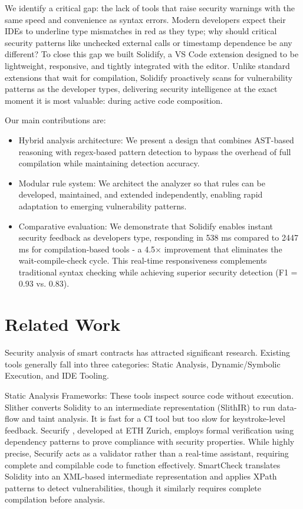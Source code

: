 \documentclass[10pt, a4paper]{article}
\begin{document}
We identify a critical gap: the lack of tools that raise security warnings with the same speed and convenience as syntax errors. Modern developers expect their IDEs to underline type mismatches in red as they type; why should critical security patterns like unchecked external calls or timestamp dependence be any different? To close this gap we built Solidify, a VS Code extension designed to be lightweight, responsive, and tightly integrated with the editor. Unlike standard extensions that wait for compilation, Solidify proactively scans for vulnerability patterns as the developer types, delivering security intelligence at the exact moment it is most valuable: during active code composition.

Our main contributions are:
\begin{itemize}
    \item Hybrid analysis architecture: We present a design that combines AST-based reasoning with regex-based pattern detection to bypass the overhead of full compilation while maintaining detection accuracy.
    \item Modular rule system: We architect the analyzer so that rules can be developed, maintained, and extended independently, enabling rapid adaptation to emerging vulnerability patterns.
    \item Comparative evaluation: We demonstrate that Solidify enables instant security feedback as developers type, responding in 538 ms compared to 2447 ms for compilation-based tools - a 4.5$\times$ improvement that eliminates the wait-compile-check cycle. This real-time responsiveness complements traditional syntax checking while achieving superior security detection (F1 = 0.93 vs. 0.83).
\end{itemize}

\section{Related Work}
Security analysis of smart contracts has attracted significant research. Existing tools generally fall into three categories: Static Analysis, Dynamic/Symbolic Execution, and IDE Tooling.

Static Analysis Frameworks: These tools inspect source code without execution. Slither \cite{feist2019} converts Solidity to an intermediate representation (SlithIR) to run data-flow and taint analysis. It is fast for a CI tool but too slow for keystroke-level feedback. Securify \cite{tsankov2018}, developed at ETH Zurich, employs formal verification using dependency patterns to prove compliance with security properties. While highly precise, Securify acts as a validator rather than a real-time assistant, requiring complete and compilable code to function effectively. SmartCheck \cite{tikhomirov2018} translates Solidity into an XML-based intermediate representation and applies XPath patterns to detect vulnerabilities, though it similarly requires complete compilation before analysis.
\end{document}
